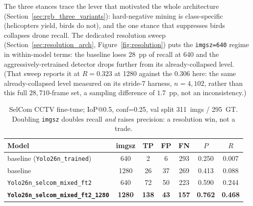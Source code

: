 The three stances trace the lever that motivated the whole architecture (Section~\ref{sec:rgb_three_variants}): hard-negative mining is class-specific (helicopters yield, birds do not), and the one stance that suppresses birds collapses drone recall. The dedicated resolution sweep (Section~\ref{sec:resolution_arch}, Figure~\ref{fig:resolution}) puts the \texttt{imgsz=640} regime in within-model terms: the baseline loses $28$~pp of recall at 640 and the aggressively-retrained detector drops further from its already-collapsed level. (That sweep reports it at $R=0.323$ at 1280 against the $0.306$ here: the same already-collapsed level measured on its stride-7 harness, $n=4{,}102$, rather than this full $28{,}710$-frame set, a sampling difference of $1.7$~pp, not an inconsistency.)

\begin{table}[htbp]
    \centering
    \caption{SelCom CCTV fine-tune; IoP@0.5, conf=0.25, val split 311~imgs / 295~GT. Doubling \texttt{imgsz} doubles recall \emph{and} raises precision: a resolution win, not a trade.}
    \label{tab:selcom}
    \begin{tabular}{lcccccc}
        \toprule
        Model & imgsz & TP & FP & FN & $P$ & $R$ \\
        \midrule
        baseline (\texttt{Yolo26n\_trained})        & 640  &   2 &  6 & 293 & 0.250 & 0.007 \\
        baseline                                    & 1280 &  26 & 37 & 269 & 0.413 & 0.088 \\
        \texttt{Yolo26n\_selcom\_mixed\_ft2}        & 640  &  72 & 50 & 223 & 0.590 & 0.244 \\
        \textbf{\texttt{Yolo26n\_selcom\_mixed\_ft2\_1280}} & \textbf{1280} & \textbf{138} & \textbf{43} & \textbf{157} & \textbf{0.762} & \textbf{0.468} \\
        \bottomrule
    \end{tabular}
\end{table}

